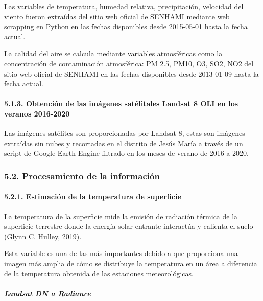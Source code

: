 \documentclass[
]{article}
\begin{document}
Las variables de temperatura, humedad relativa, precipitación, velocidad
del viento fueron extraídas del sitio web oficial de SENHAMI mediante
web scrapping en Python en las fechas disponibles desde 2015-05-01 hasta
la fecha actual.

La calidad del aire se calcula mediante variables atmosféricas como la
concentración de contaminación atmosférica: PM 2.5, PM10, O3, SO2, NO2
del sitio web oficial de SENHAMI en las fechas disponibles desde
2013-01-09 hasta la fecha actual.

\hypertarget{obtenciuxf3n-de-las-imuxe1genes-satuxe9litales-landsat-8-oli-en-los-veranos-2016-2020}{%
\paragraph{5.1.3. Obtención de las imágenes satélitales Landsat 8 OLI en
los veranos
2016-2020}\label{obtenciuxf3n-de-las-imuxe1genes-satuxe9litales-landsat-8-oli-en-los-veranos-2016-2020}}

Las imágenes satélites son proporcionadas por Landsat 8, estas son
imágenes extraídas sin nubes y recortadas en el distrito de Jesús María
a través de un script de Google Earth Engine filtrado en los meses de
verano de 2016 a 2020.

\hypertarget{procesamiento-de-la-informaciuxf3n}{%
\subsubsection{5.2. Procesamiento de la
información}\label{procesamiento-de-la-informaciuxf3n}}

\hypertarget{estimaciuxf3n-de-la-temperatura-de-superficie}{%
\paragraph{5.2.1. Estimación de la temperatura de
superficie}\label{estimaciuxf3n-de-la-temperatura-de-superficie}}

La temperatura de la superficie mide la emisión de radiación térmica de
la superficie terrestre donde la energía solar entrante interactúa y
calienta el suelo (Glynn C. Hulley, 2019).

Esta variable es una de las más importantes debido a que proporciona una
imagen más amplia de cómo se distribuye la temperatura en un área a
diferencia de la temperatura obtenida de las estaciones meteorológicas.

\hypertarget{landsat-dn-a-radiance}{%
\subparagraph{\texorpdfstring{\emph{Landsat DN a
Radiance}}{Landsat DN a Radiance}}\label{landsat-dn-a-radiance}}
\end{document}
